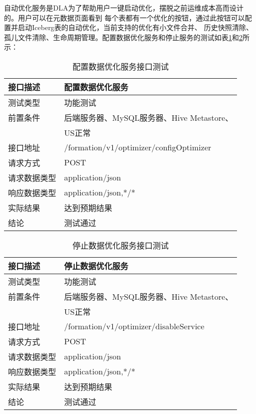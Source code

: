 自动优化服务是DLA为了帮助用户一键启动优化，摆脱之前运维成本高而设计的。用户可以在元数据页面看到
每个表都有一个优化的按钮，通过此按钮可以配置并启动Iceberg表的自动优化，当前支持的优化有小文件合并、
历史快照清除、孤儿文件清除、生命周期管理。配置数据优化服务和停止服务的测试如表\ref{tab:exampletable13}和\ref{tab:exampletable14}所示：

\begin{table}[H]
  \centering
  \caption{配置数据优化服务接口测试}
  \label{tab:exampletable13}
  \begin{tabular}{ll}
    \toprule
    接口描述         & 配置数据优化服务         \\
    \midrule
    测试类型         & 功能测试         \\
    前置条件         & 后端服务器、MySQL服务器、Hive Metastore、 \\
                   & US正常         \\
    接口地址       & /formation/v1/optimizer/configOptimizer        \\
    请求方式         & POST      \\
    请求数据类型         & application/json     \\
    响应数据类型         & application/json,*/*           \\
    实际结果         & 达到预期结果           \\
    结论            & 测试通过           \\
    \bottomrule
  \end{tabular}
\end{table}

\begin{table}[H]
  \centering
  \caption{停止数据优化服务接口测试}
  \label{tab:exampletable14}
  \begin{tabular}{ll}
    \toprule
    接口描述         & 停止数据优化服务         \\
    \midrule
    测试类型         & 功能测试         \\
    前置条件         & 后端服务器、MySQL服务器、Hive Metastore、 \\
                    & US正常         \\
    接口地址       & /formation/v1/optimizer/disableService        \\
    请求方式         & POST      \\
    请求数据类型         & application/json     \\
    响应数据类型         & application/json,*/*           \\
    实际结果         & 达到预期结果           \\
    结论            & 测试通过           \\
    \bottomrule
  \end{tabular}
\end{table}

